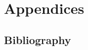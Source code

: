 \documentclass[reqno,12pt]{tufte-book}
\numberwithin{equation}{subsection}
\begin{document}
\clearpage
\part{Appendices}
\appendix
\begin{appendices}
\chapter{Bibliography}


\end{appendices}
\end{document}
